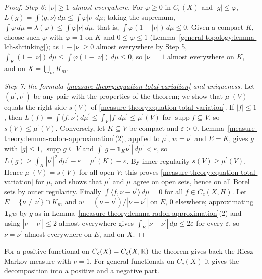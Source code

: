 \begin{proof}
\emph{Step 6: $|\nu| \geq 1$ almost everywhere.} For $\varphi \geq 0$ in $C_c(X)$ and $|g| \leq \varphi$, $L(g) = \int\langle g, \nu\rangle\,d\mu \leq \int\varphi|\nu|\,d\mu$; taking the supremum,
$\int\varphi\,d\mu = \lambda(\varphi) \leq \int\varphi|\nu|\,d\mu$, that is, $\int\varphi(1 - |\nu|)\,d\mu \leq 0$. Given a compact $K$, choose such $\varphi$ with $\varphi = 1$ on $K$ and $0 \leq \varphi \leq 1$
(Lemma~\ref{general-topology:lemma-lch-shrinking}); as $1 - |\nu| \geq 0$ almost everywhere by Step 5, $\int_K(1 - |\nu|)\,d\mu \leq \int\varphi(1 - |\nu|)\,d\mu \leq 0$, so $|\nu| = 1$ almost
everywhere on $K$, and on $X = \bigcup_mK_m$.

\emph{Step 7: the formula \eqref{measure-theory:equation-total-variation} and uniqueness.} Let $(\mu^{\prime}, \nu^{\prime})$ be any pair with the properties of the theorem; we show that $\mu^{\prime}(V)$ equals
the right side $s(V)$ of \eqref{measure-theory:equation-total-variation}. If $|f| \leq 1$, then $L(f) = \int\langle f, \nu^{\prime}\rangle\,d\mu^{\prime} \leq \int_V|f|\,d\mu^{\prime} \leq \mu^{\prime}(V)$ for
$\operatorname{supp}f \subseteq V$, so $s(V) \leq \mu^{\prime}(V)$. Conversely, let $K \subseteq V$ be compact and $\varepsilon > 0$. Lemma~\ref{measure-theory:lemma-radon-approximation}(2), applied to $\mu^{\prime}$,
$w = \nu^{\prime}$ and $E = K$, gives $g$ with $|g| \leq 1$, $\operatorname{supp}g \subseteq V$ and $\int|g - \mathbf{1}_K\nu^{\prime}|\,d\mu^{\prime} < \varepsilon$, so
$L(g) \geq \int_K|\nu^{\prime}|^2\,d\mu^{\prime} - \varepsilon = \mu^{\prime}(K) - \varepsilon$. By inner regularity $s(V) \geq \mu^{\prime}(V)$. Hence $\mu^{\prime}(V) = s(V)$ for all open $V$; this proves
\eqref{measure-theory:equation-total-variation} for $\mu$, and shows that $\mu^{\prime}$ and $\mu$ agree on open sets, hence on all Borel sets by outer regularity. Finally
$\int\langle f, \nu - \nu^{\prime}\rangle\,d\mu = 0$ for all $f \in C_c(X, H)$. Let $E = \{\nu \neq \nu^{\prime}\} \cap K_m$ and $w = (\nu - \nu^{\prime})/|\nu - \nu^{\prime}|$ on $E$, $0$ elsewhere; approximating
$\mathbf{1}_Ew$ by $g$ as in Lemma~\ref{measure-theory:lemma-radon-approximation}(2) and using $|\nu - \nu^{\prime}| \leq 2$ almost everywhere gives $\int_E|\nu - \nu^{\prime}|\,d\mu \leq 2\varepsilon$ for every
$\varepsilon$, so $\nu = \nu^{\prime}$ almost everywhere on $E$, and on $X$.
\end{proof}

For a positive functional on $C_c(X) = C_c(X, \mathbb{R})$ the theorem gives back the Riesz--Markov measure with $\nu = 1$. For general functionals on $C_c(X)$ it gives the decomposition into a positive and a negative
part.

